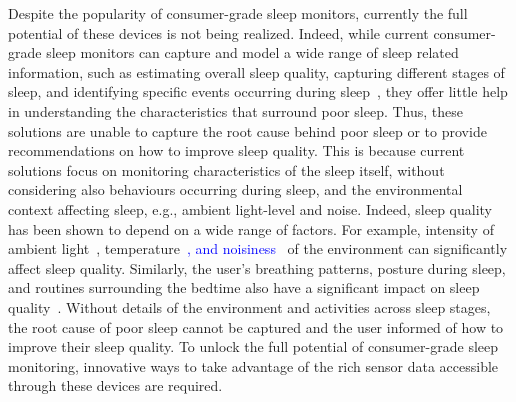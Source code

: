 Despite the popularity of consumer-grade sleep monitors, currently the full potential of these devices is not being realized. Indeed, while current consumer-grade sleep monitors can capture and model a wide range of sleep related information, such as estimating overall sleep quality, capturing different stages of sleep, and identifying specific events occurring during sleep~\cite{kay2012lullaby,zhang2013real,sleepmonitor}, they offer little help in understanding the characteristics that surround poor sleep. Thus, these solutions are unable to capture the root cause behind poor sleep or to provide recommendations on how to improve sleep quality. This is because current solutions focus on monitoring characteristics of the sleep itself, without considering also behaviours occurring during sleep, and the environmental context affecting sleep, e.g., ambient light-level and noise. Indeed, sleep quality has been shown to depend on a wide range of factors. For example, intensity of ambient light~\cite{hood04determinants}, temperature\textcolor{blue}{~\cite{}, and noisiness~\cite{}} of the environment can significantly affect sleep quality. Similarly, the user's breathing patterns, posture during sleep, and routines surrounding the bedtime also have a significant impact on sleep quality\textcolor{blue}{~\cite{}}. Without details of the environment and activities across sleep stages, the root cause of poor sleep cannot be captured and the user informed of how to improve their sleep quality. To unlock the full potential of consumer-grade sleep monitoring, innovative ways to take advantage of the rich sensor data accessible through these devices are required.








